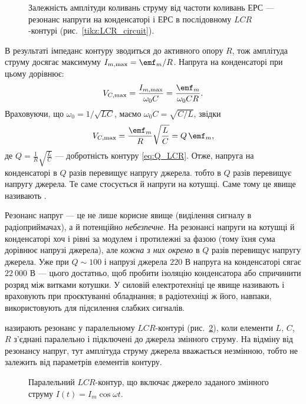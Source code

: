 \begin{figure}
	\centering
	\caption{Залежність амплітуди коливань струму від частоти коливань ЕРС --- резонанс напруги на конденсаторі і ЕРС в послідовному $LCR$-контурі (рис.~\ref{tikz:LCR_circuit}).}
	\label{tikz:current_resonance}
\end{figure}

В результаті імпеданс контуру зводиться до активного опору $R$, тож амплітуда струму досягає максимуму $I_{m,\max} = \emf_m/R$. Напруга на конденсаторі при цьому дорівнює:
\begin{equation*}
	V_{C,\max} = \frac{I_{m,\max}}{\omega_0 C} = \frac{\emf_m}{\omega_0 C R}.
\end{equation*}
Враховуючи, що $\omega_0 = 1/\sqrt{LC}$, маємо $\omega_0 C = \sqrt{C/L}$, звідки
\begin{equation*}
	V_{C,\max} = \frac{\emf_m}{R}\sqrt{\frac{L}{C}} = Q\,\emf_m,
\end{equation*}
де $Q = \frac{1}{R}\sqrt{\frac{L}{C}}$ --- добротність контуру \eqref{eq:Q_LCR}. Отже, напруга на конденсаторі в $Q$ разів перевищує напругу джерела.
тобто в $Q$ разів перевищує напругу джерела. Те саме стосується й напруги на котушці. Саме тому це явище називають .

\begin{Attention}
	Резонанс напруг --- це не лише корисне явище (виділення сигналу в радіоприймачах), а й потенційно \emph{небезпечне}. На резонансі напруги на котушці й конденсаторі хоч і рівні за модулем і протилежні за фазою (тому їхня сума дорівнює напрузі джерела), але \emph{кожна з них окремо} в $Q$ разів перевищує напругу джерела. Уже при $Q \sim 100$ і напрузі джерела $220$ В напруга на конденсаторі сягає $22\ 000$ В --- цього достатньо, щоб пробити ізоляцію конденсатора або спричинити розряд між витками котушки. У силовій електротехніці це явище називають  і враховують при проєктуванні обладнання; в радіотехніці ж його, навпаки, використовують для підсилення слабких сигналів.
\end{Attention}


 назирають резонанс у паралельному $LCR$-контурі (рис.~\ref{tikz:parallel_circuit}), коли елементи $L$, $C$, $R$ з'єднані паралельно і підключені до джерела змінного струму. На відміну від резонансу напруг, тут амплітуда струму джерела вважається незмінною, тобто не залежить від параметрів елементів контуру.

\begin{figure}
	\centering
	\caption{Паралельний $LCR$-контур, що включає джерело заданого змінного струму $I(t) = I_m \cos\omega t$.}
	\label{tikz:parallel_circuit}
\end{figure}

